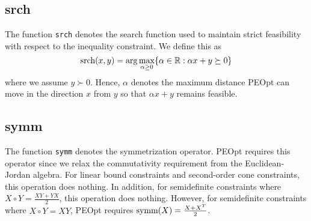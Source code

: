 \documentclass{report}
\newcommand{\re}{\mathbb{R}}
\begin{document}
\subsection{srch}

        The function \texttt{srch} denotes the search function used to maintain strict feasibility with respect to the inequality constraint.  We define this as
$$
    \textnormal{srch}(x,y)=\arg\max\limits_{\alpha\geq 0} \{ \alpha\in\re : \alpha x + y \succeq 0\}
$$
where we assume $y\succ 0$.  Hence, $\alpha$ denotes the maximum distance PEOpt can move in the direction $x$ from $y$ so that $\alpha x + y$ remains feasible.

\subsection{symm}

        The function \texttt{symm} denotes the symmetrization operator.  PEOpt requires this operator since we relax the commutativity requirement from the Euclidean-Jordan algebra.  For linear bound constraints and second-order cone constraints, this operation does nothing.  In addition, for semidefinite constraints where $X\circ Y=\frac{XY+YX}{2}$, this operation does nothing.  However, for semidefinite constraints where $X\circ Y=XY$, PEOpt requires $\textnormal{symm}(X)=\frac{X+X^T}{2}$.
\end{document}
